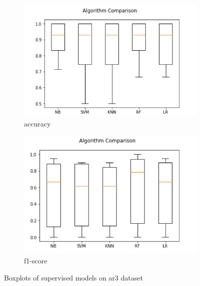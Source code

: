 \begin{figure}[h!]
  \centering
  \begin{subfigure}[b]{0.4\linewidth}
    \includegraphics[width=\linewidth]{report/ar3.png}
    \caption{accuracy}
  \end{subfigure}
  \begin{subfigure}[b]{0.4\linewidth}
    \includegraphics[width=\linewidth]{report/ar3_f.png}
    \caption{f1-score}
  \end{subfigure}
  \caption{Boxplots of supervised models on ar3 dataset}
\end{figure}

